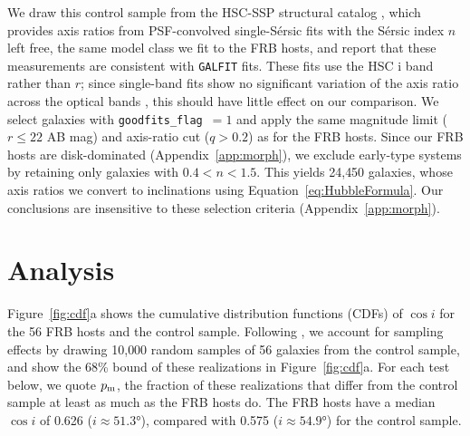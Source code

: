\documentclass[apjl, linenumbers]{aastex701}
\begin{document}
We draw this control sample from the HSC-SSP structural catalog \citep{Kawinwanichakij}, which provides axis ratios from PSF-convolved single-S\'ersic fits with the S\'ersic index $n$ left free, the same model class we fit to the FRB hosts, and report that these measurements are consistent with \texttt{GALFIT} fits. These fits use the HSC i band rather than $r$; since single-band fits show no significant variation of the axis ratio across the optical bands \citep{Vika2013}, this should have little effect on our comparison. We select galaxies with \texttt{goodfits\_flag}~$=1$ and apply the same magnitude limit ($r \leq 22$ AB mag) and axis-ratio cut ($q > 0.2$) as for the FRB hosts. Since our FRB hosts are disk-dominated (Appendix~\ref{app:morph}), we exclude early-type systems by retaining only galaxies with $0.4 < n < 1.5$. This yields 24{,}450 galaxies, whose axis ratios we convert to inclinations using Equation~\ref{eq:HubbleFormula}. Our conclusions are insensitive to these selection criteria (Appendix~\ref{app:morph}).

\section{Analysis} \label{sec:results}

Figure~\ref{fig:cdf}a shows the cumulative distribution functions (CDFs) of $\cos i$ for the 56 FRB hosts and the control sample. Following \citet{Bhardwaj2024}, we account for sampling effects by drawing 10{,}000 random samples of 56 galaxies from the control sample, and show the 68\% bound of these realizations in Figure~\ref{fig:cdf}a. For each test below, we quote $p_{\rm m}$, the fraction of these realizations that differ from the control sample at least as much as the FRB hosts do. The FRB hosts have a median $\cos i$ of 0.626 ($i \approx \ang{51.3}$), compared with 0.575 ($i \approx \ang{54.9}$) for the control sample.
 
\end{document}
